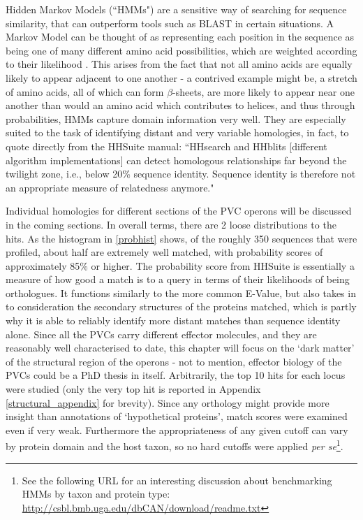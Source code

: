 Hidden Markov Models (``HMMs") are a sensitive way of searching for sequence similarity, that can outperform tools such as BLAST in certain situations. A Markov Model can be thought of as representing each position in the sequence as being one of many different amino acid possibilities, which are weighted according to their likelihood \citep{Eddy2004}. This arises from the fact that not all amino acids are equally likely to appear adjacent to one another - a contrived example might be, a stretch of amino acids, all of which can form $\beta$-sheets, are more likely to appear near one another than would an amino acid which contributes to helices, and thus through probabilities, HMMs capture domain information very well. They are especially suited to the task of identifying distant and very variable homologies, in fact, to quote directly from the HHSuite manual: ``HHsearch and HHblits [different algorithm implementations] can detect homologous relationships far beyond the twilight zone, i.e., below 20\% sequence identity. Sequence identity is therefore not an appropriate measure of relatedness anymore."

Individual homologies for different sections of the PVC operons will be discussed in the coming sections. In overall terms, there are 2 loose distributions to the hits. As the histogram in \vref{probhist} shows, of the roughly 350 sequences that were profiled, about half are extremely well matched, with probability scores of approximately 85\% or higher. The probability score from HHSuite is essentially a measure of how good a match is to a query in terms of their likelihoods of being orthologues. It functions similarly to the more common E-Value, but also takes in to consideration the secondary structures of the proteins matched, which is partly why it is able to reliably identify more distant matches than sequence identity alone. Since all the PVCs carry different effector molecules, and they are reasonably well characterised to date, this chapter will focus on the `dark matter' of the structural region of the operons - not to mention, effector biology of the PVCs could be a PhD thesis in itself. Arbitrarily, the top 10 hits for each locus were studied (only the very top hit is reported in Appendix \vref{structural_appendix} for brevity). Since any orthology might provide more insight than annotations of `hypothetical proteins', match scores were examined even if very weak. Furthermore the appropriateness of any given cutoff can vary by protein domain and the host taxon, so no hard cutoffs were applied \emph{per se}\footnote{See the following URL for an interesting discussion about benchmarking HMMs by taxon and protein type: \url{http://csbl.bmb.uga.edu/dbCAN/download/readme.txt}}.

